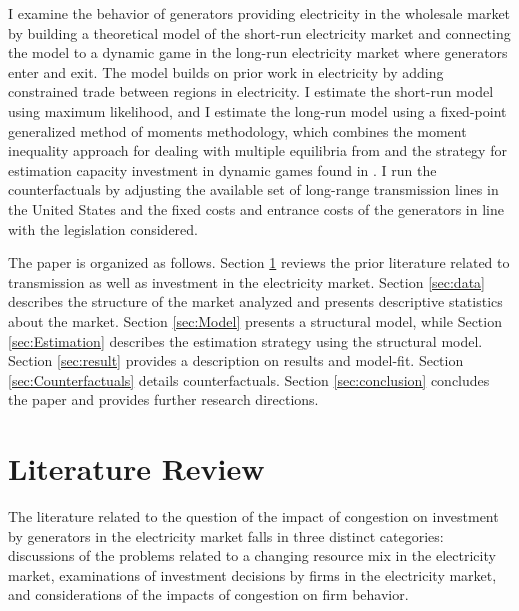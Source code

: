 \documentclass[12pt]{article}
\begin{document}
I examine the behavior of generators providing electricity in the wholesale market by building a theoretical model of the short-run electricity market and connecting the model to a dynamic game in the long-run electricity market where generators enter and exit. The model builds on prior work in electricity by adding constrained trade between regions in electricity. I estimate the short-run model using maximum likelihood, and I estimate the long-run model using a fixed-point generalized method of moments methodology, which combines the moment inequality approach for dealing with multiple equilibria from \cite{holmes2011diffusion} and the strategy for estimation capacity investment in dynamic games found in \cite{gowrisankaran2024computable}. I run the counterfactuals by adjusting the available set of long-range transmission lines in the United States and the fixed costs and entrance costs of the generators in line with the legislation considered.

 The paper is organized as follows. Section \ref{sec:literature} reviews the prior literature related to transmission as well as investment in the electricity market. Section \ref{sec:data} describes the structure of the market analyzed and presents descriptive statistics about the market. Section \ref{sec:Model} presents a structural model, while Section \ref{sec:Estimation} describes the estimation strategy using the structural model. Section \ref{sec:result} provides a description on results and model-fit.  Section \ref{sec:Counterfactuals} details counterfactuals. Section \ref{sec:conclusion} concludes the paper and provides further research directions.

\section{Literature Review} \label{sec:literature}

The literature related to the question of the impact of congestion on investment by generators in the electricity market falls in three distinct categories: discussions of the problems related to a changing resource mix in the electricity market, examinations of investment decisions by firms in the electricity market, and considerations of the impacts of congestion on firm behavior. 
\end{document}

